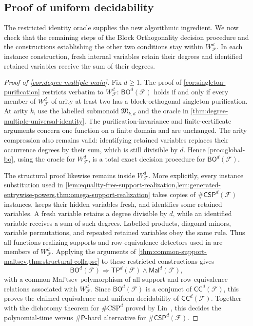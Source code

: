 \documentclass[11pt,letterpaper,onecolumn]{article}
\theoremstyle{plain}
\theoremstyle{definition}
\theoremstyle{remark}
\newcommand{\cF}{\mathcal F}
\newcommand{\CC}{\mathsf{CC}}
\newcommand{\BO}{\mathsf{BO}}
\newcommand{\TP}{\mathsf{TP}}
\newcommand{\Mal}{\mathsf{Mal}}
\newcommand{\CSPdeg}[2]{\mathsf{\#CSP}^{#1}(#2)}
\newcommand{\WFdeg}[1]{W_{\cF}^{#1}}
\begin{document}
\subsection{Proof of uniform decidability}
\label{subsec:degree-tractability}

The restricted identity oracle supplies the new algorithmic ingredient.
We now check that the remaining steps of the Block Orthogonality decision
procedure and the constructions establishing the other two conditions
stay within $\WFdeg{d}$.  In each instance construction, fresh internal
variables retain their degrees and identified retained variables receive
the sum of their degrees.

\begin{proof}[Proof of \cref{cor:degree-multiple-main}]
Fix $d\ge1$.  The proof of \cref{cor:singleton-purification} restricts
verbatim to $\WFdeg{d}$: $\BO^d(\cF)$ holds if and only if every
member of $\WFdeg{d}$ of arity at least two has a block-orthogonal
singleton purification.  At arity $k$, use the labelled submonoid
$\mathfrak M_{k,d}$ and the oracle in
\cref{thm:degree-multiple-universal-identity}.  The purification-invariance
and finite-certificate arguments concern one function on a finite domain and are unchanged.
The arity compression also remains valid: identifying retained
variables replaces their occurrence degrees by their sum, which is still
divisible by $d$.  Hence \cref{proc:global-bo}, using the
oracle for $\WFdeg{d}$, is a total exact decision procedure for
$\BO^d(\cF)$.

The structural proof likewise remains inside $\WFdeg{d}$.  More
explicitly, every instance substitution used in
\cref{lem:equality-free-support-realization,lem:generated-entrywise-powers,thm:omega-support-realization}
takes copies of $\CSPdeg{d}{\cF}$ instances, keeps their hidden
variables fresh, and identifies some retained variables.  A fresh variable retains a
degree divisible by $d$, while an identified variable receives a sum
of such degrees.  Labelled products, diagonal minors, variable
permutations, and repeated retained variables obey the same rule.  Thus all
functions realizing supports and row-equivalence detectors used in
 are members of
$\WFdeg{d}$.  Applying the arguments of
\cref{thm:common-support-maltsev,thm:structural-collapse} to these
restricted constructions gives
\[
  \BO^d(\cF)
  \Longrightarrow
  \TP^d(\cF)\wedge\Mal^d(\cF),
\]
with a common Mal'tsev polymorphism of all support and row-equivalence
relations associated with $\WFdeg{d}$.  Since $\BO^d(\cF)$ is a conjunct of
$\CC^d(\cF)$, this proves the claimed equivalence and uniform decidability
of $\CC^d(\cF)$.  Together with the dichotomy theorem
for $\#\mathrm{CSP}^{d}$ proved by Lin~\cite[Theorem~3]{Lin2021}, this
decides the polynomial-time versus $\#\mathsf P$-hard alternative for
$\CSPdeg{d}{\cF}$.
\end{proof}
\end{document}

